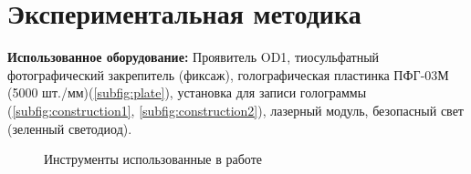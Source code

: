 \documentclass[aps,twocolumn,secnumarabic,balancelastpage,amsmath,amssymb,nofootinbib, floatfix]{revtex4-1}
\begin{document}
\section{Экспериментальная методика}
\textbf{Использованное оборудование:}
Проявитель OD1, тиосульфатный фотографический закрепитель (фиксаж), голографическая пластинка ПФГ-03М (5000 шт./мм)(\ref{subfig:plate}), установка для записи голограммы (\ref{subfig:construction1}, \ref{subfig:construction2}), лазерный модуль, безопасный свет (зеленный светодиод).
\begin{figure}[htbp]
	\centering
	\quad
	\quad
	\label{fig:insruments}
	\caption{Инструменты использованные в работе}
\end{figure}
\end{document}
